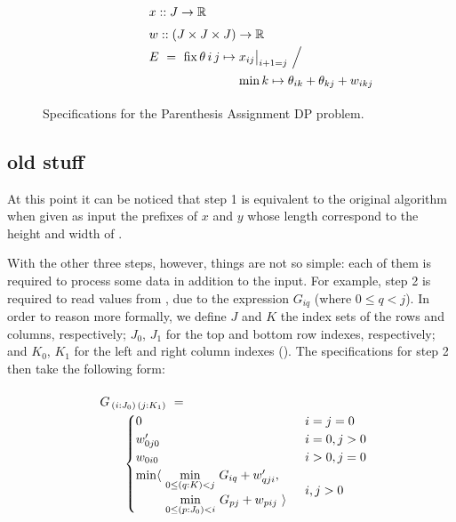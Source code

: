 \begin{figure}
\[
  \renewcommand\arraystretch{1.5}
  \begin{array}{@{}l@{}l@{}l@{}}
    \lspan3{x :: J\to\R} \\
    \lspan3{w :: (J\times J\times J)\to\R} \\
    E ~=~ \fix \theta\,i\,j\mapsto{}
      & \lspan2{x_{ij}\big|_{i+1=j} ~\Big/~} \\
      & \min k\mapsto\theta_{ik}+\theta_{kj}+w_{ikj} \\
  \end{array}
\]
\caption{\label{evaluation:paren spec}
  Specifications for the Parenthesis Assignment DP problem.}
\end{figure}


\subsection{old stuff}


At this point it can be noticed that step 1 is equivalent to the original
algorithm when given as input the prefixes of $x$ and $y$ whose length correspond to the
height and width of .

With the other three steps, however, things are not so simple:
each of them is required to process some data in addition to the input.
For example, step 2 is required to read values from , due to the expression
$G_{iq}$ (where $\scriptstyle 0\leq q<j$).
In order to reason more formally, we define $J$ and $K$ the index sets of the rows
and columns, respectively; $J_0$, $J_1$ for the top and bottom row indexes, respectively;
and $K_0$, $K_1$ for the left and right column indexes ().
The specifications for step 2 then take the following form:

\begin{equation}\LeftEqNo
\renewcommand\arraystretch{1.5}
\begin{array}{l@{}l}
	G_{\,(i : J_0)\,(j : K_1)} ~=~  \\
	\qquad
	\begin{cases}
		0                        & i=j=0 \\
		w'_{0j0}                 & i=0, j>0 \\
		w_{0i0}                  & i>0, j=0 \\
		\begin{array}{@{}l@{~}l}
		  \min\langle & \underset{0\leq (q:K) <j}\min ~ G_{iq} + w'_{qji}, \\
		              & \underset{0\leq (p:J_0) <i}\min ~ G_{pj} + w_{pij}~\rangle
		\end{array}              & i,j>0
	\end{cases}
\end{array}
\end{equation}

